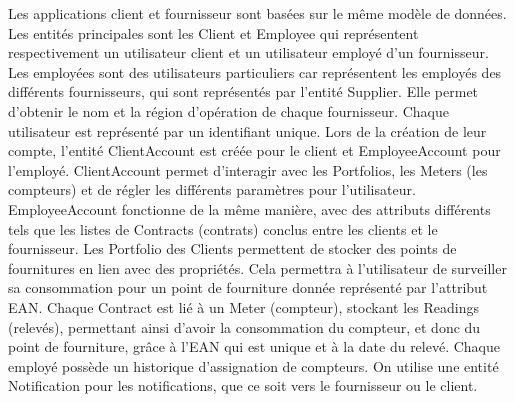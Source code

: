 \documentclass[../rapport.tex]{subfiles}
\begin{document}
Les applications client et fournisseur sont basées sur le même modèle de données. Les entités principales sont les Client et Employee qui représentent respectivement un utilisateur client et un utilisateur employé d'un fournisseur. Les employées sont des utilisateurs particuliers car représentent les employés des différents fournisseurs, qui sont représentés par l'entité Supplier. Elle permet d'obtenir le nom et la région d'opération de chaque fournisseur. Chaque utilisateur est représenté par un identifiant unique. Lors de la création de leur compte, l'entité ClientAccount est créée pour le client et EmployeeAccount pour l'employé. ClientAccount permet d'interagir avec les Portfolios, les Meters (les compteurs) et de régler les différents paramètres pour l'utilisateur.  EmployeeAccount fonctionne de la même manière, avec des attributs différents tels que les listes de Contracts (contrats) conclus entre les clients et le fournisseur. Les Portfolio des Clients permettent de stocker des points de fournitures en lien avec des propriétés. Cela permettra à l'utilisateur de surveiller sa consommation pour un point de fourniture donnée représenté par l'attribut EAN. Chaque Contract est lié à un Meter (compteur), stockant les Readings (relevés), permettant ainsi d'avoir la consommation du compteur, et donc du point de fourniture, grâce à l'EAN qui est unique et à la date du relevé. Chaque employé possède un historique d'assignation de compteurs. On utilise une entité Notification pour les notifications, que ce soit vers le fournisseur ou le client.
\end{document}
